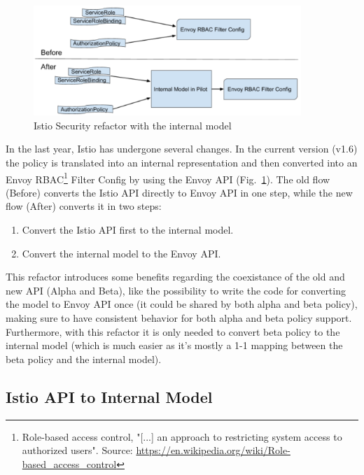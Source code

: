 \begin{figure}
    \centering
    \includegraphics[width=0.9\textwidth]{chapters/images/chp3/3.png}
    \caption{Istio Security refactor with the internal model}
    \label{fig:int-rep}
\end{figure}


In the last year, Istio has undergone several changes. In the current version (v1.6) the policy is translated into an internal representation and then converted into an Envoy RBAC\footnote{Role-based access control, "[...] an approach to restricting system access to authorized users". Source: \url{https://en.wikipedia.org/wiki/Role-based_access_control}} Filter Config by using the Envoy API (Fig.~\ref{fig:int-rep}).
The old flow (Before) converts the Istio API directly to Envoy API in one step, while the new flow (After) converts it in two steps: 
\begin{enumerate}
    \item Convert the Istio API first to the internal model.
    \item Convert the internal model to the Envoy API.
\end{enumerate}

This refactor introduces some benefits regarding the coexistance of the old and new API (Alpha and Beta), like the possibility to write the code for converting the model to Envoy API once (it could be shared by both alpha and beta policy), making sure to have consistent behavior for both alpha and beta policy support. Furthermore, with this refactor it is only needed to convert beta policy to the internal model (which is much easier as it’s mostly a 1-1 mapping between the beta policy and the internal model).

\subsection{Istio API to Internal Model}

